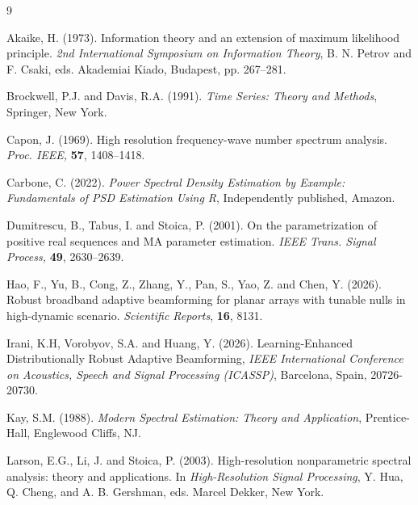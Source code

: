 \documentclass[twoside]{article}
\begin{document}
\begin{thebibliography}{9}



Akaike, H. (1973). Information theory and an extension of maximum likelihood principle. \textit{2nd International Symposium on Information Theory}, B. N. Petrov and F. Csaki, eds. Akademiai Kiado, Budapest, pp. 267--281.



Brockwell, P.J. and Davis, R.A. (1991). \textit{Time Series: Theory and Methods}, Springer, New York.



Capon, J. (1969). High resolution frequency-wave number spectrum analysis. \textit{Proc. IEEE,} \textbf{57}, 1408--1418.



Carbone, C. (2022). \textit{Power Spectral Density Estimation by Example: Fundamentals of PSD Estimation Using R}, Independently published, Amazon.



Dumitrescu, B., Tabus, I. and Stoica, P. (2001). On the parametrization of positive real sequences and MA parameter estimation. \textit{IEEE Trans. Signal Process,} \textbf{49}, 2630--2639.



Hao, F., Yu, B., Cong, Z., Zhang, Y., Pan, S., Yao, Z. and Chen, Y. (2026). Robust broadband adaptive beamforming for planar arrays with tunable nulls in high-dynamic scenario. \textit{Scientific Reports}, \textbf{16}, 8131.



Irani, K.H, Vorobyov, S.A. and Huang, Y. (2026). Learning-Enhanced Distributionally Robust Adaptive Beamforming, \textit{IEEE International Conference on Acoustics, Speech and Signal Processing (ICASSP)}, Barcelona, Spain, 20726-20730.



Kay, S.M. (1988). \textit{Modern Spectral Estimation: Theory and Application}, Prentice-Hall, Englewood Cliffs, NJ.



Larson, E.G., Li, J. and Stoica, P. (2003). High-resolution nonparametric spectral analysis: theory and applications. In \textit{High-Resolution Signal Processing}, Y. Hua, Q. Cheng, and A. B. Gershman, eds. Marcel Dekker, New York.




\end{thebibliography}
\end{document}
